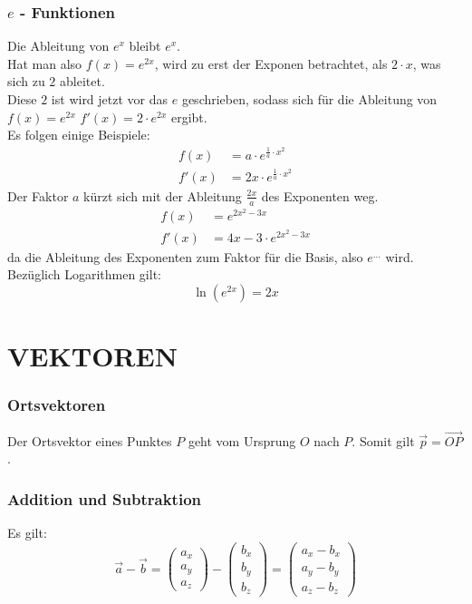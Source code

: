 \documentclass[a4paper,12pt]{article}
\begin{document}
\section{$e$ - Funktionen}
Die Ableitung von $e^x$ bleibt $e^x$.\\
Hat man also $f(x) = e^{2x}$, wird zu erst der Exponen betrachtet, als $2 \cdot x$, was sich zu $2$ ableitet.\\
Diese $2$ ist wird jetzt vor das $e$ geschrieben, sodass sich für die Ableitung von $f(x) = e^{2x}$ $f'(x) = 2 \cdot e^{2x}$ ergibt.\\
Es folgen einige Beispiele:\\
\begin{equation}
\begin{split}
f(x) & = a \cdot e^{\frac{1}{a} \cdot x^2}\\
f'(x) & = 2x \cdot e^{\frac{1}{a} \cdot x^2}
\end{split}
\end{equation}
Der Faktor $a$ kürzt sich mit der Ableitung $\frac{2x}{a}$ des Exponenten weg.
\begin{equation}
\begin{split}
f(x) & = e^{2x^2-3x}\\
f'(x) & = 4x - 3 \cdot e^{2x^2-3x}
\end{split}
\end{equation}
da die Ableitung des Exponenten zum Faktor für die Basis, also $e^{...}$ wird.\\
Bezüglich Logarithmen gilt:$$\ln{(e^{2x})} = 2x$$
\pagebreak
\part{VEKTOREN}
\section{Ortsvektoren}
Der Ortsvektor eines Punktes $P$ geht vom Ursprung $O$ nach $P$. Somit gilt $\vec{p} = \vec{OP}$.
\section{Addition und Subtraktion}
Es gilt:
$$\vec{a} - \vec{b} = \begin{pmatrix}a_x\\a_y\\a_z\end{pmatrix} - \begin{pmatrix}b_x\\b_y\\b_z\end{pmatrix} = \begin{pmatrix}a_x - b_x\\a_y - b_y\\a_z - b_z\end{pmatrix}$$
\end{document}

